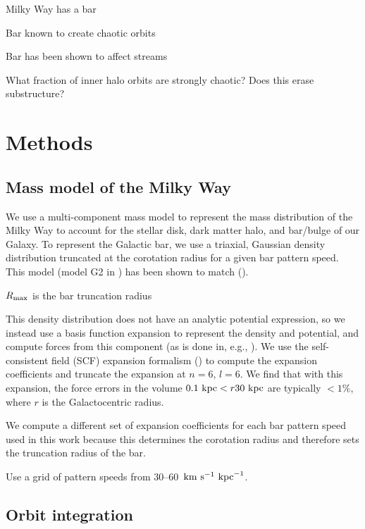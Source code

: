 \documentclass[modern]{aastex61}
\begin{document}
Milky Way has a bar

Bar known to create chaotic orbits

Bar has been shown to affect streams

What fraction of inner halo orbits are strongly chaotic?
Does this erase substructure?

\section{Methods} \label{sec:methods}

\subsection{Mass model of the Milky Way} \label{sec:potential}

We use a multi-component mass model to represent the mass distribution of the
Milky Way to account for the stellar disk, dark matter halo, and bar/bulge of
our Galaxy.
To represent the Galactic bar, we use a triaxial, Gaussian density
distribution truncated at the corotation radius for a given bar pattern speed.
This model (model G2 in \citealt{Dwek:1995}) has been shown to match
 (\citealt{Dwek:1995,Wang:2012}).

$R_{\rm max}$ is the bar truncation radius

This density distribution does not have an analytic potential expression, so
we instead use a basis function expansion to represent the density and
potential, and compute forces from this component (as is done in, e.g.,
\citealt{Wang:2012}).
We use the self-consistent field (SCF) expansion formalism
(\citealt{Hernquist:1992}) to compute the expansion coefficients and truncate
the expansion at $n=6$, $l=6$.
We find that with this expansion, the force errors in the volume $0.1~\mathrm{kpc} < r
30~\mathrm{kpc}$ are typically $<1\%$, where $r$ is the Galactocentric radius.

We compute a different set of expansion coefficients for each bar pattern speed
used in this work because this determines the corotation radius and therefore
sets the truncation radius of the bar.

Use a grid of pattern speeds from 30--60~$\mathrm{km}~\mathrm{s}^{-1}~\mathrm{kpc}^{-1}$.

\subsection{Orbit integration} \label{sec:orbit-int}
\end{document}
